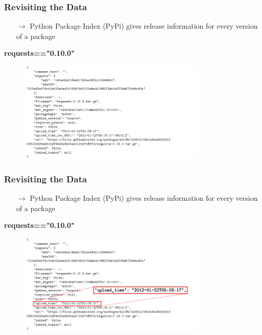 \documentclass[fleqn]{beamer}
\begin{document}
    \begin{frame}
        \frametitle{Revisiting the Data}
        \begin{itemize}
            \item[$\to$] Python Package Index (PyPi) gives release
                information for every version of a package
        \end{itemize}
        \centering \textbf{requests=="0.10.0"}
        \begin{figure}
            \centering
            \includegraphics[width=0.8\textwidth]
                             {./pics/json.png}
        \end{figure}
    \end{frame}

    \begin{frame}
        \frametitle{Revisiting the Data}
        \begin{itemize}
            \item[$\to$] Python Package Index (PyPi) gives release
                information for every version of a package
        \end{itemize}
        \centering \textbf{requests=="0.10.0"}
        \begin{figure}
            \centering
            \includegraphics[width=0.8\textwidth]
                             {./pics/select_json.png}
        \end{figure}
    \end{frame}
\end{document}
